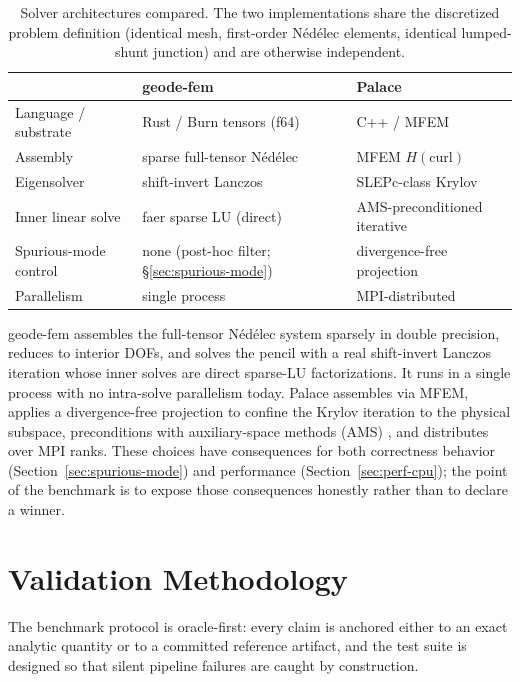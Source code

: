 \documentclass{anvil-paper}
\begin{document}
\begin{table}[t]
  \centering
  \caption{Solver architectures compared. The two implementations share the
  discretized problem definition (identical mesh, first-order
  N\'ed\'elec elements, identical lumped-shunt junction) and are otherwise
  independent.}
  \label{tab:architectures}
  \footnotesize
  \setlength{\tabcolsep}{4pt}
  \begin{tabular}{@{}lll@{}}
    \toprule
     & \textbf{geode-fem} & \textbf{Palace} \\
    \midrule
    Language / substrate & Rust / Burn tensors (f64) & C++ / MFEM \\
    Assembly & sparse full-tensor N\'ed\'elec & MFEM $H(\mathrm{curl})$ \\
    Eigensolver & shift-invert Lanczos & SLEPc-class Krylov \\
    Inner linear solve & faer sparse LU (direct) & AMS-preconditioned iterative \\
    Spurious-mode control & none (post-hoc filter; \S\ref{sec:spurious-mode}) &
      divergence-free projection \\
    Parallelism & single process & MPI-distributed \\
    \bottomrule
  \end{tabular}
\end{table}

geode-fem assembles the full-tensor N\'ed\'elec system sparsely in double
precision, reduces to interior DOFs, and solves the pencil with a real
shift-invert Lanczos iteration whose inner solves are direct sparse-LU
factorizations. It runs in a single process with no intra-solve parallelism
today. Palace assembles via MFEM, applies a divergence-free projection to
confine the Krylov iteration to the physical subspace, preconditions with
auxiliary-space methods (AMS)
\citep{hiptmair-xu,tzaniovkolevpanayotsvassilevski2018parallel}, and
distributes over MPI ranks. These choices have consequences for both
correctness behavior (Section~\ref{sec:spurious-mode}) and performance
(Section~\ref{sec:perf-cpu}); the point of the benchmark is to expose those
consequences honestly rather than to declare a winner.

\section{Validation Methodology}
\label{sec:methodology}

The benchmark protocol is oracle-first: every claim is anchored either to
an exact analytic quantity or to a committed reference artifact, and the
test suite is designed so that silent pipeline failures are caught by
construction.
\end{document}
